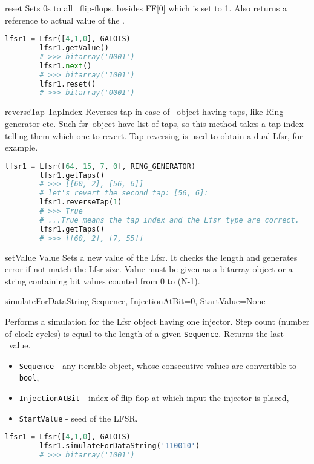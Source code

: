 {reset} {} {
	Sets 0s to all \Lfsr\ flip-flops, besides FF[0] which is set to 1. Also returns a reference to actual value of the \Lfsr.
}
\begin{lstlisting}[language=Python]
		lfsr1 = Lfsr([4,1,0], GALOIS)
		lfsr1.getValue()
		# >>> bitarray('0001')
		lfsr1.next()
		# >>> bitarray('1001')
		lfsr1.reset()
		# >>> bitarray('0001')
\end{lstlisting}

 {reverseTap} {TapIndex} {
	Reverses tap in case of \Lfsr\ object having taps, like Ring generator etc. Such \:fsr\ object have list of taps, so this method takes a tap index telling them which one to revert. Tap reversing is used to obtain a dual Lfsr, for example.
}
\begin{lstlisting}[language=Python]
		lfsr1 = Lfsr([64, 15, 7, 0], RING_GENERATOR)
		lfsr1.getTaps()
		# >>> [[60, 2], [56, 6]]
		# let's revert the second tap: [56, 6]:
		lfsr1.reverseTap(1)
		# >>> True
		# ...True means the tap index and the Lfsr type are correct.
		lfsr1.getTaps()
		# >>> [[60, 2], [7, 55]]
\end{lstlisting}

 {setValue} {Value} {
	Sets a new value of the Lfsr. It checks the length and generates error if not match the Lfsr size. Value must be given as a bitarray object or a string containing bit values counted from 0 to (N-1).
}

 {simulateForDataString} {Sequence, InjectionAtBit=0, StartValue=None} {
	Performs a simulation for the Lfsr object having one injector. Step count (number of clock cycles) is equal to the length of a given \texttt{Sequence}. Returns the last \Lfsr\ value.
	\begin{itemize}
		\item \texttt{Sequence} - any iterable object, whose consecutive values are convertible to \texttt{bool},
		\item \texttt{InjectionAtBit} - index of flip-flop at which input the injector is placed,
		\item \texttt{StartValue} - seed of the LFSR.
	\end{itemize}
}
\begin{lstlisting}[language=Python]
		lfsr1 = Lfsr([4,1,0], GALOIS)
		lfsr1.simulateForDataString('110010')
		# >>> bitarray('1001')
\end{lstlisting}

